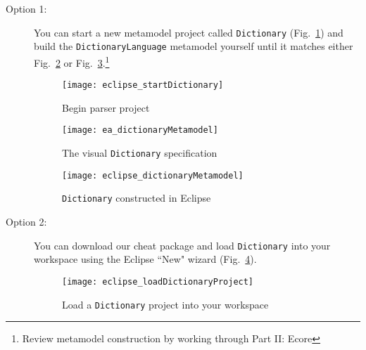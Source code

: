 \begin{description}
\item[Option 1:] You can start a new metamodel project called \texttt{Dictionary} (Fig.~\ref{eclipse:startMetamodel}) and build the
\texttt{DictionaryLanguage} metamodel yourself until it matches either Fig.~\ref{ea:dictLang} or Fig.~\ref{eclipse:dictLang}.\footnote{Review metamodel
construction by working through Part II: Ecore}

\begin{figure}[htbp]
\begin{center}
  \texttt{[image: eclipse\_startDictionary]}
  \caption{Begin parser project}
  \label{eclipse:startMetamodel}
\end{center}
\end{figure}

\newpage

\vspace*{1cm}

\begin{figure}[htb]
\begin{center}
  \texttt{[image: ea\_dictionaryMetamodel]}
  \caption{The visual \texttt{Dictionary} specification}
  \label{ea:dictLang}
\end{center}
\end{figure}

\vspace{1cm}

\begin{figure}[htb]
\begin{center}
  \texttt{[image: eclipse\_dictionaryMetamodel]}
  \caption{\texttt{Dictionary} constructed in Eclipse}
  \label{eclipse:dictLang}
\end{center}
\end{figure}

\newpage

\newpage
\item[Option 2:] You can download our cheat package and load \texttt{Dictionary} into your workspace using the Eclipse ``New" wizard
(Fig.~\ref{eclipse_cheatPackage}).

\vspace{0.5cm}

\begin{figure}[htbp]
\begin{center}
  \texttt{[image: eclipse\_loadDictionaryProject]}
  \caption{Load a \texttt{Dictionary} project into your workspace}
  \label{eclipse_cheatPackage}
\end{center}
\end{figure}


\end{description}
